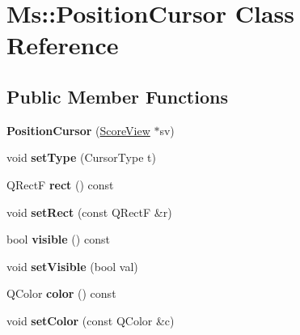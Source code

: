 \hypertarget{class_ms_1_1_position_cursor}{}\section{Ms\+:\+:Position\+Cursor Class Reference}
\label{class_ms_1_1_position_cursor}
\subsection*{Public Member Functions}
\begin{DoxyCompactItemize}
\item 
\mbox{\label{class_ms_1_1_position_cursor_ad6600240a9b563b2731adc5463d7369b}} 
{\bfseries Position\+Cursor} (\hyperlink{class_ms_1_1_score_view}{Score\+View} $\ast$sv)
\item 
\mbox{\label{class_ms_1_1_position_cursor_a4a13c7d3cbf677ce066aa5f3d0277c9f}} 
void {\bfseries set\+Type} (Cursor\+Type t)
\item 
\mbox{\label{class_ms_1_1_position_cursor_ab7f81e6223cfe87fe008ec360d5603c2}} 
Q\+RectF {\bfseries rect} () const
\item 
\mbox{\label{class_ms_1_1_position_cursor_a0fccaeb4e241b41a837fada745bd40fd}} 
void {\bfseries set\+Rect} (const Q\+RectF \&r)
\item 
\mbox{\label{class_ms_1_1_position_cursor_a6b0d26f3148abd5a62f8fa970c8aaaba}} 
bool {\bfseries visible} () const
\item 
\mbox{\label{class_ms_1_1_position_cursor_a79ba776a9239fbf98e784a1adea6c8e6}} 
void {\bfseries set\+Visible} (bool val)
\item 
\mbox{\label{class_ms_1_1_position_cursor_a23f9b7a0d241ef58c08e9207a4f7b1b5}} 
Q\+Color {\bfseries color} () const
\item 
\mbox{\label{class_ms_1_1_position_cursor_a6bf6ec5f6197511e4af2bb8b21dedf42}} 
void {\bfseries set\+Color} (const Q\+Color \&c)

\end{DoxyCompactItemize}
